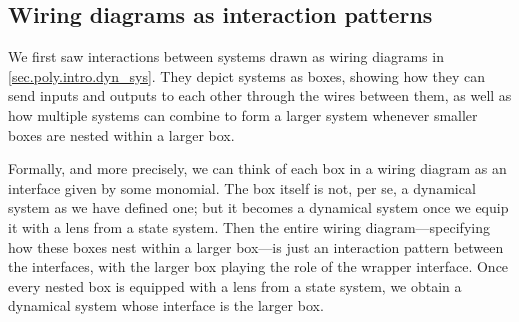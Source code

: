 \documentclass[Book-Poly]{subfiles}
\begin{document}
\subsection{Wiring diagrams as interaction patterns}

We first saw interactions between systems drawn as wiring diagrams in \cref{sec.poly.intro.dyn_sys}.
They depict systems as boxes, showing how they can send inputs and outputs to each other through the wires between them, as well as how multiple systems can combine to form a larger system whenever smaller boxes are nested within a larger box.

Formally, and more precisely, we can think of each box in a wiring diagram as an interface given by some monomial.
The box itself is not, per se, a dynamical system as we have defined one; but it becomes a dynamical system once we equip it with a lens from a state system.
Then the entire wiring diagram---specifying how these boxes nest within a larger box---is just an interaction pattern between the interfaces, with the larger box playing the role of the wrapper interface.
Once every nested box is equipped with a lens from a state system, we obtain a dynamical system whose interface is the larger box.
\end{document}
